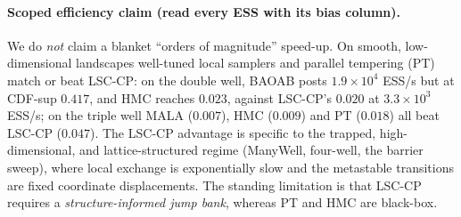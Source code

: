 \paragraph{Scoped efficiency claim (read every ESS with its bias column).}
We do \emph{not} claim a blanket ``orders of magnitude'' speed-up. On smooth, low-dimensional
landscapes well-tuned local samplers and parallel tempering (PT) match or beat LSC-CP: on the
double well, BAOAB posts $1.9\times10^4$ ESS/s but at CDF-sup $0.417$, and HMC reaches $0.023$,
against LSC-CP's $0.020$ at $3.3\times10^3$ ESS/s; on the triple well MALA ($0.007$), HMC ($0.009$)
and PT ($0.018$) all beat LSC-CP ($0.047$). The LSC-CP advantage is specific to the trapped,
high-dimensional, and lattice-structured regime (ManyWell, four-well, the barrier sweep), where
local exchange is exponentially slow and the metastable transitions are fixed coordinate
displacements. The standing limitation is that LSC-CP requires a \emph{structure-informed jump
bank}, whereas PT and HMC are black-box.
